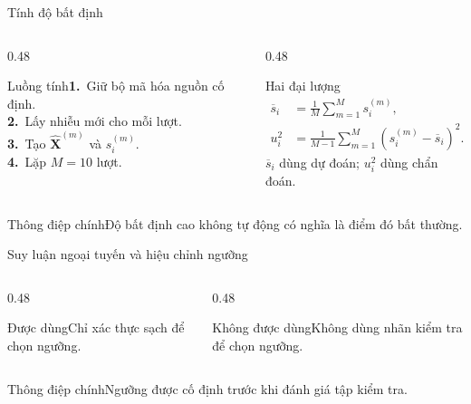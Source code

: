 \documentclass[aspectratio=169]{beamer}
\newcommand{\takeaway}[1]{\begin{alertblock}{Thông điệp chính}#1\end{alertblock}}
\newcommand{\step}[2]{\textbf{#1.}~#2}
\begin{document}
\begin{frame}{Tính độ bất định}
  \begin{columns}[T,onlytextwidth]
    \begin{column}{0.48\textwidth}\begin{block}{Luồng tính}\step{1}{Giữ bộ mã hóa nguồn cố định.}\\\step{2}{Lấy nhiễu mới cho mỗi lượt.}\\\step{3}{Tạo \(\widehat{\mathbf X}^{(m)}\) và \(s_i^{(m)}\).}\\\step{4}{Lặp \(M=10\) lượt.}\end{block}\end{column}
    \begin{column}{0.48\textwidth}\begin{exampleblock}{Hai đại lượng}\[\begin{aligned} \overline{s}_i&=\frac1M\sum_{m=1}^M s_i^{(m)},\\ u_i^2&=\frac1{M-1}\sum_{m=1}^M(s_i^{(m)}-\overline{s}_i)^2. \end{aligned}\]\(\overline s_i\) dùng dự đoán; \(u_i^2\) dùng chẩn đoán.\end{exampleblock}\end{column}
  \end{columns}
  \takeaway{Độ bất định cao không tự động có nghĩa là điểm đó bất thường.}
\end{frame}

\begin{frame}{Suy luận ngoại tuyến và hiệu chỉnh ngưỡng}
  \begin{center}
  \end{center}
  \begin{columns}[T,onlytextwidth]
    \begin{column}{0.48\textwidth}\begin{block}{Được dùng}\small Chỉ xác thực sạch để chọn ngưỡng.\end{block}\end{column}
    \begin{column}{0.48\textwidth}\begin{alertblock}{Không được dùng}\small Không dùng nhãn kiểm tra để chọn ngưỡng.\end{alertblock}\end{column}
  \end{columns}
  \takeaway{Ngưỡng được cố định trước khi đánh giá tập kiểm tra.}
\end{frame}
\end{document}
